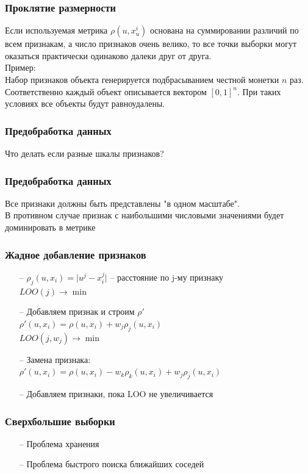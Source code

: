 \documentclass[12pt]{beamer}
\begin{document}
\begin{frame}\frametitle{Проклятие размерности}
Если используемая метрика
${\rho(u, x_u^i)}$
основана на суммировании различий по всем признакам, а число признаков очень велико,
то все точки выборки могут оказаться практически одинаково
далеки друг от друга.\\


\vspace{8mm}
Пример:\\
Набор признаков объекта генерируется подбрасыванием честной монетки $n$ раз. Соответственно
каждый объект описывается вектором $[0, 1]^n$. При таких условиях все объекты будут равноудалены.


\end{frame}

\begin{frame}\frametitle{Предобработка данных}
Что делать если разные шкалы признаков?
\end{frame}
\begin{frame}\frametitle{Предобработка данных}
Все признаки должны быть представлены "в одном масштабе". \\
В противном случае признак с наибольшими числовыми значениями будет доминировать в метрике
\end{frame}


\begin{frame}\frametitle{Жадное добавление признаков}
\begin{itemize}
\item[--] ${\rho_j(u, x_i) = \vert u^j - x_i^j \vert}$ -- расстояние по j-му признаку\\
$LOO(j) \rightarrow \min$\\
\item[--] Добавляем признак и строим $\rho'$\\
${\rho'(u, x_i) = \rho(u, x_i) + w_j\rho_j(u, x_i)}$\\
$LOO(j, w_j) \rightarrow \min$\\
\item[--] Замена признака:\\
${\rho'(u, x_i) = \rho(u, x_i) - w_k\rho_k(u, x_i) + w_j\rho_j(u, x_i)}$\\
\item[--] Добавляем признаки, пока LOO не увеличивается
\end{itemize}

\end{frame}
\begin{frame}\frametitle{Сверхбольшие выборки}
\begin{itemize}
\item[--] Проблема хранения
\item[--] Проблема быстрого поиска ближайших соседей
\end{itemize}
\end{frame}
\end{document}

